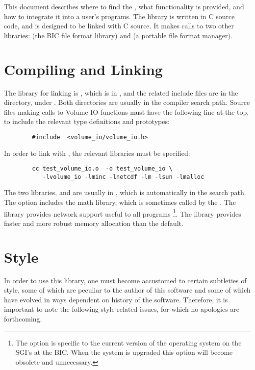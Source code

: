 This document describes where to find the \vol,
what functionality is provided, and
how to integrate it into a user's programs.
The library is written in C source code, and is designed
to be linked with C source.  It makes calls to two other libraries:
 (the BIC file format library)
and  (a portable file format manager).

\chapter{Compiling and Linking}

The library for linking is , which is in
, and the related include files are in the directory,
 under .  Both directories
are usually in the compiler search path.
Source files making calls to Volume IO functions must have the
following line at the top, to include the relevant type definitions and
prototypes:

{\bf\begin{verbatim}
        #include  <volume_io/volume_io.h>
\end{verbatim}}

In order to link with \vol, the relevant libraries must be
specified:
{\bf\begin{verbatim}
        cc test_volume_io.o  -o test_volume_io \
           -lvolume_io -lminc -lnetcdf -lm -lsun -lmalloc
\end{verbatim}}

The two libraries,  and 
are usually in , which is
automatically in the search path.  The  option includes the
math library, which is sometimes called by the \vol.  The
 library provides network support useful to all programs
\footnote{The \name{-lsun} option is specific to the current version
of the operating system on the SGI's at the BIC.  When the system is
upgraded this option will become obsolete and unnecessary.}.
The  library provides faster and more robust memory
allocation than the default.

\chapter{Style}

In order to use this library, one must become accustomed to certain
subtleties of style, some of which are peculiar to the author of this
software and some of which have evolved in ways dependent on history
of the software.  Therefore, it is important to note the following
style-related issues, for which no apologies are forthcoming.

